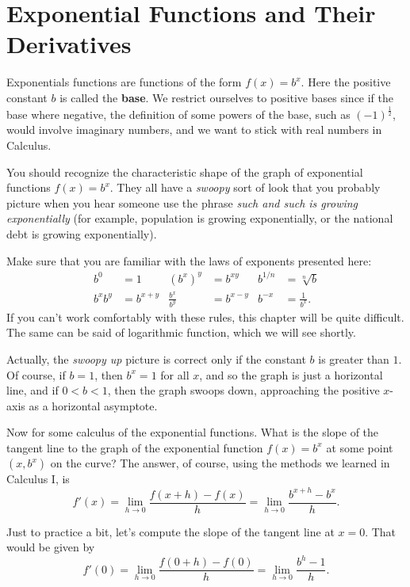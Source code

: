 \section{Exponential Functions and Their Derivatives}

Exponentials functions are functions of the form $f(x)=b^x$. Here
the positive constant $b$ is called the \textbf{base}. We restrict
ourselves to positive bases since if the base where negative, the
definition of some powers of the base, such as $(-1)^{\frac12}$, would involve
imaginary numbers, and we want to stick with real numbers in Calculus. 

You should recognize the characteristic shape of the graph of
exponential functions $f(x)=b^x$. They all have a \emph{swoopy} sort of
look that you probably picture when you hear someone use the phrase \emph{such and such is growing exponentially} (for example, population is
growing exponentially, or the national debt is growing exponentially).

Make sure that you are familiar with the laws of exponents presented here:
\begin{align*}
b^0&=1 & (b^x)^y&=b^{xy} & b^{1/n}&=\sqrt[n]{b}\\
b^x b^y&=b^{x+y} & \frac{b^x}{b^y}&=b^{x-y} & b^{-x}&=\frac1{b^x}.
\end{align*}
If you can't work comfortably with these rules, this chapter will be quite
difficult.
The same can be said of logarithmic function, which we will see shortly.

Actually, the \emph{swoopy up} picture is correct only if the constant $b$
is greater than $1$. Of course, if $b=1$, then $b^x=1$ for all $x$, and
so the graph is just a horizontal line, and if $0<b<1$, then the graph
swoops down, approaching the positive $x$-axis as a horizontal
asymptote.

Now for some calculus of the exponential functions. What is the
slope of the tangent line to the graph of the exponential function
$f(x)=b^x$ at some point $(x,b^x)$ on the curve? The answer, of course, using the
methods we learned in Calculus I, 
is
\[f'(x)=\lim_{h\to0}\frac{f(x+h)-f(x)}h=\lim_{h\to0}\frac{b^{x+h}-b^x}h.\]

Just to practice a bit, let's compute the slope of the tangent line at
$x=0$. That would be given by
\[f'(0)=\lim_{h\to0}\frac{f(0+h)-f(0)}h=\lim_{h\to0}\frac{b^h-1}h.\]

